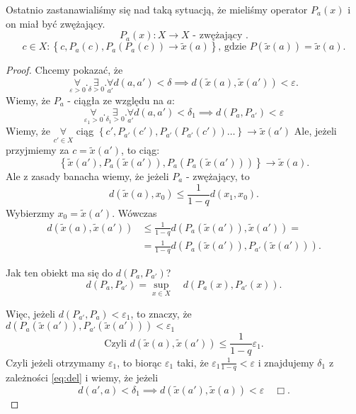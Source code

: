 \documentclass[../main.tex]{subfiles}
\begin{document}
Ostatnio zastanawialiśmy się nad taką sytuacją, że mieliśmy operator $P_a(x)$ i on miał być zwężający. \[
    P_a(x): X\to X \text{ - zwężający }
.\]
\[
    c\in X: \left\{ c,P_a(c),P_a(P_a(c)) \to \tilde x(a) \right\}\text{, gdzie }P(\tilde x(a)) = \tilde x(a)
.\]
\begin{proof}
    Chcemy pokazać, że \[
        \underset{\varepsilon >0}{\forall} . \underset{\delta > 0}{\exists}. \underset{a'}{\forall}  d(a,a') < \delta \implies d(\tilde x(a),\tilde x(a')) < \varepsilon
    .\]
    Wiemy, że $P_a$ - ciągła ze względu na $a$:
    \begin{equation}\label{eq:del}
        \underset{\varepsilon_1>0}{\forall}. \underset{\delta_1>0}{\exists} .\underset{a'}{\forall} d(a,a') < \delta_1 \implies d(P_a, P_{a'}) < \varepsilon
    \end{equation}
    Wiemy, że $\underset{c'\in X}{\forall}$ ciąg $\left\{ c',P_{a'}(c'), P_{a'}(P_{a'}(c'))\ldots \right\} \to \tilde x(a')$
    Ale, jeżeli przyjmiemy za $c = \tilde x(a')$, to ciąg:
    \[
        \left\{ \tilde x(a'),P_{a}(\tilde x(a')), P_{a}(P_{a}(\tilde x(a'))) \right\} \to \tilde x(a)
    .\]
    Ale z zasady banacha wiemy, że jeżeli $P_{a}$ - zwężający, to
    \[
        d(\tilde x(a),x_0) \le \frac{1}{1-q} d(x_1,x_0)
    .\]
    Wybierzmy $x_0 = \tilde x(a')$. Wówczas
    \begin{align*}
        d(\tilde x(a),\tilde x(a')) &\le \frac{1}{1-q}d(P_a(\tilde x(a')) ,\tilde x(a')) =\\
        &= \frac{1}{1-q} d(P_a(\tilde x(a')), P_{a'}(\tilde x(a')))
    .\end{align*}
    \begin{pytanie}
        Jak ten obiekt ma się do $d(P_{a},P_{a'})$?\\
        \[
            d(P_a,P_{a'}) = \underset{x\in X}{\sup} \quad d(P_a(x), P_{a'}(x))
        .\]
    \end{pytanie}
        Więc, jeżeli $d(P_{a'},P_a)<\varepsilon_1$, to znaczy, że $d(P_a(\tilde x(a')),P_{a'}(\tilde x(a'))) < \varepsilon_1$\\
        \[
            \text{Czyli } d(\tilde x(a),\tilde x(a')) \le \frac{1}{1-q} \varepsilon_1
        .\]
        Czyli jeżeli otrzymamy $\varepsilon_1$, to biorąc $\varepsilon_1$ taki, że $\varepsilon_1 \frac{1}{1-q}<\varepsilon$ i znajdujemy $\delta_1$ z zależności \ref{eq:del} i wiemy, że jeżeli
       \[
           d(a',a) < \delta_1 \implies d(\tilde x(a'),\tilde x(a))<\varepsilon \quad\Box
       .\]
\end{proof}
\end{document}
